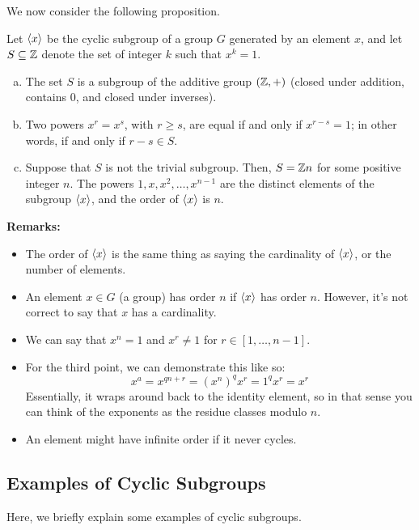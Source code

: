 \documentclass[letterpaper]{article}
\begin{document}
We now consider the following proposition.
\begin{mdframed}
    \begin{proposition}
        Let $\langle x \rangle$ be the cyclic subgroup of a group $G$ generated by an element $x$, and let $S \subseteq \mathbb{Z}$ denote the set of integer $k$ such that $x^k = 1$.
        \begin{enumerate}[(a)]
            \item The set $S$ is a subgroup of the additive group $(\mathbb{Z}, +)$ (closed under addition, contains 0, and closed under inverses). 
            \item Two powers $x^r = x^s$, with $r \geq s$, are equal if and only if $x^{r - s} = 1$; in other words, if and only if $r - s \in S$. 
            \item Suppose that $S$ is not the trivial subgroup. Then, $S = \mathbb{Z} n$ for some positive integer $n$. The powers $1, x, x^2, \dots, x^{n - 1}$ are the distinct elements of the subgroup $\langle x \rangle$, and the order of $\langle x \rangle$ is $n$. 
        \end{enumerate}
    \end{proposition}
\end{mdframed}

\textbf{Remarks:}
\begin{itemize}
    \item The order of $\langle x \rangle$ is the same thing as saying the cardinality of $\langle x \rangle$, or the number of elements. 
    \item An element $x \in G$ (a group) has order $n$ if $\langle x \rangle$ has order $n$. However, it's not correct to say that $x$ has a cardinality. 
    \item We can say that $x^n = 1$ and $x^r \neq 1$ for $r \in [1, \dots, n - 1]$. 
    \item For the third point, we can demonstrate this like so: 
    \[x^a = x^{qn + r} = (x^{n})^{q} x^r = 1^q x^r = x^r\]
    Essentially, it wraps around back to the identity element, so in that sense you can think of the exponents as the residue classes modulo $n$. 
    \item An element might have infinite order if it never cycles. 
\end{itemize}

\subsection{Examples of Cyclic Subgroups}
Here, we briefly explain some examples of cyclic subgroups.
\end{document}
